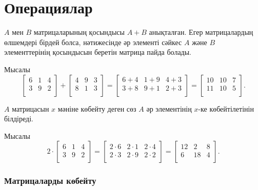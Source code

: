 \section{Операциялар}

$A$ мен $B$ матрицаларының қосындысы 
$A+B$ анықталған. Егер матрицалардың 
өлшемдері бірдей болса, нәтижесінде әр элементі сәйкес $A$ және $B$ элементтерінің қосындысын беретін матрица пайда болады.


Мысалы
\[
 \begin{bmatrix}
  6 & 1 & 4 \\
  3 & 9 & 2 \\
 \end{bmatrix}
+
 \begin{bmatrix}
  4 & 9 & 3 \\
  8 & 1 & 3 \\
 \end{bmatrix}
=
 \begin{bmatrix}
  6+4 & 1+9 & 4+3 \\
  3+8 & 9+1 & 2+3 \\
 \end{bmatrix}
=
 \begin{bmatrix}
  10 & 10 & 7 \\
  11 & 10 & 5 \\
 \end{bmatrix}.
\]

$A$ матрицасын $x$ мәніне көбейту деген сөз
$A$ әр элементінің $x$-ке көбейтілетінін 
білдіреді.

Мысалы
\[
 2 \cdot \begin{bmatrix}
  6 & 1 & 4 \\
  3 & 9 & 2 \\
 \end{bmatrix}
=
 \begin{bmatrix}
  2 \cdot 6 & 2\cdot1 & 2\cdot4 \\
  2\cdot3 & 2\cdot9 & 2\cdot2 \\
 \end{bmatrix}
=
 \begin{bmatrix}
  12 & 2 & 8 \\
  6 & 18 & 4 \\
 \end{bmatrix}.
\]

\subsubsection{Матрицаларды көбейту}

